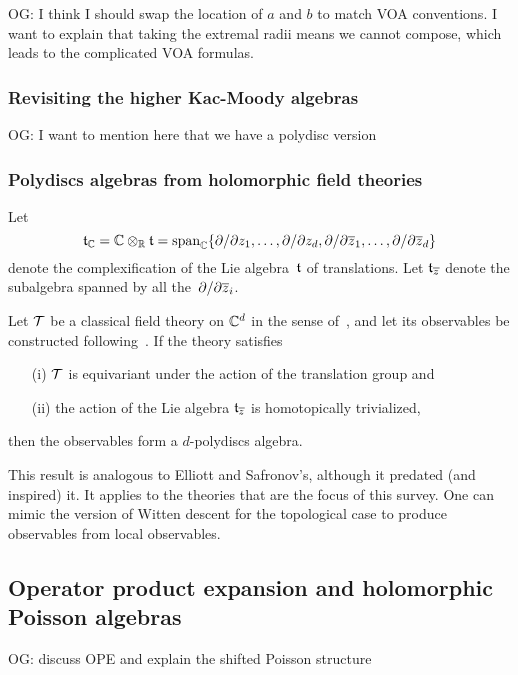 \documentclass[11pt]{amsart}
\def\owen#1{{\textcolor{violet!65!black}{OG: {#1}}}}
\begin{document}
\owen{I think I should swap the location of $a$ and $b$ to match VOA conventions. I want to explain that taking the extremal radii means we cannot compose, which leads to the complicated VOA formulas.}

\subsubsection{Revisiting the higher Kac-Moody algebras}

\owen{I want to mention here that we have a polydisc version}

\subsubsection{Polydiscs algebras from holomorphic field theories}

Let 
\[
\mathfrak t_\mathbb C = \mathbb C \otimes_\mathbb R \mathfrak t = \text{span}_{\mathbb C}\{\partial/\partial z_1, \ldots, \partial/\partial z_d, \partial/\partial {\overline{z}}_1, \ldots, \partial/\partial {\overline{z}}_d  \}
\]
denote the complexification of the Lie algebra~$\mathfrak t$ of translations.
Let $\mathfrak t_{{\overline{z}}}$ denote the subalgebra spanned by all the~$\partial/\partial {\overline{z}}_i$.

\begin{thm}[\cite{CG1},\owen{precise location}]
Let $\mathcal T$ be a classical field theory on $\mathbb C^d$ in the sense of~\cite{CosBook},
and let its observables be constructed following~\cite{CG2}.
If the theory satisfies 
\begin{enumerate}
\item[(i)] $\mathcal T$ is equivariant under the action of the translation group and
\item[(ii)] the action of the Lie algebra $\mathfrak t_{{\overline{z}}}$ is homotopically trivialized,
\end{enumerate}
then the observables form a $d$-polydiscs algebra.
\end{thm}

This result is analogous to Elliott and Safronov's, although it predated (and inspired) it.
It applies to the theories that are the focus of this survey.
One can mimic the version of Witten descent for the topological case to produce observables from local observables.

\subsection{Operator product expansion and holomorphic Poisson algebras}

\owen{discuss OPE and explain the shifted Poisson structure}
\end{document}
